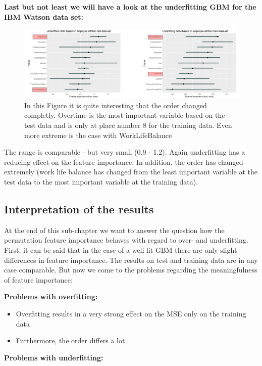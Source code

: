 \documentclass[]{krantz}
\providecommand{\tightlist}{%
  \setlength{\itemsep}{0pt}\setlength{\parskip}{0pt}}
\begin{document}
\textbf{Last but not least we will have a look at the underfitting GBM
for the IBM Watson data set:}

\begin{figure}
\includegraphics[width=40.29in]{images/IBM_under} \caption{In this Figure it is quite interesting that the order changed completly. Overtime is the most important variable based on the test data and is only at place number 8 for the training data. Even more extreme is the case with WorkLifeBalance}\label{fig:unnamed-chunk-59}
\end{figure}

The range is comparable - but very small (0.9 - 1.2). Again underfitting
has a reducing effect on the feature importance. In addition, the order
has changed extremely (work life balance has changed from the least
important variable at the test data to the most important variable at
the training data).

\subsection{Interpretation of the
results}\label{interpretation-of-the-results}

At the end of this sub-chapter we want to answer the question how the
permutation feature importance behaves with regard to over- and
underfitting. First, it can be said that in the case of a well fit GBM
there are only slight differences in feature importance. The results on
test and training data are in any case comparable. But now we come to
the problems regarding the meaningfulness of feature importance:

\textbf{Problems with overfitting:}

\begin{itemize}
\tightlist
\item
  Overfitting results in a very strong effect on the MSE only on the
  training data
\item
  Furthermore, the order differs a lot
\end{itemize}

\textbf{Problems with underfitting:}
\end{document}
